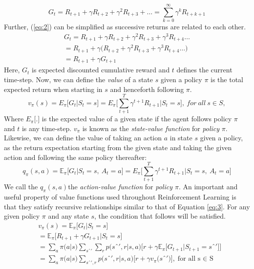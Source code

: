 \documentclass[12pt]{extarticle}
\numberwithin{equation}{section}
\begin{document}
	\begin{equation}
	G_t = R_{t+1}+\gamma R_{t+2}+\gamma^2 R_{t+3}+ \ldots =  \sum_{k=0}^{\infty} { \gamma ^{k} R_{t+k+1}} \label{eq:2}
	\end{equation}
	Further, (\ref{eq:2}) can be simplified as successive returns are related to each other.
	\begin{align}
	G_t = R_{t+1}+\gamma R_{t+2}+\gamma^2 R_{t+3}+\gamma^3 R_{t+4} \ldots \nonumber\\
	= R_{t+1}+\gamma\big(R_{t+2}+\gamma^2 R_{t+3}+\gamma^3 R_{t+4} \ldots\big) \nonumber\\
	= R_{t+1}+\gamma G_{t+1}  \label{eq:3}
	\end{align}
	Here, $G_t$ is expected discounted cumulative reward and $t$ defines the current time-step.
	Now, we can define the \textit{value} of a state $s$ given a policy $\pi$ is the total expected return when starting in $s$ and henceforth following $\pi$.
	\begin{equation}
	v_\pi(s) = E_\pi\big[G_t | S_t = s\big] = E_\pi{\bigg[ \sum_{t+1}^{T} { \gamma ^{t+1} R_{t+1} \bigg|S_t = s } \bigg],\ for\ all\ s\in S,} \label{eq:4}
	\end{equation}
	Where $E_\pi\big[.\big]$ is the expected value of a given state if the agent follows policy $\pi$ and $t$ is any time-step. $v_\pi$ is known as the \textit{state-value function} for \textit{policy} $\pi$. Likewise, we can define the value of taking an action $a$ in state $s$ given a policy, as the return expectation starting from the given state and taking the given action and following the same policy thereafter\cite{Sutton-introRL}:
	\begin{equation}
	q_\pi(s,a) = \mathbb{E}_\pi\big[G_t | S_t = s,\ A_t = a\big] = E_\pi{\bigg[ \sum_{t+1}^{T} { \gamma ^{t+1} R_{t+1} \bigg|S_t = s, \ A_t = a } \bigg]} \label{eq:5}
	\end{equation}
	We call the $q_\pi(s,a)$the  \textit{action-value function} for \textit{policy $\pi$}.
	An important and useful property of value functions used throughout Reinforcement Learning is that they satisfy recursive relationships similar to that of Equation \ref{eq:3}. For any given policy $\pi$ and any state $s$, the condition that follows will be satisfied.
	\begin{align}
	&v_\pi(s) = \mathbb{E}_\pi\big[G_t | S_t = s\big] \nonumber\\
	&= \mathbb{E}_\pi\big[R_{t+1} + \gamma G_{t+1} | S_t = s\big] \nonumber\\
	&=  \sum_{a} { \pi\big(a|s\big)}\sum_{sˆ'}\sum_{r}{p\big(sˆ',r|s,a\big)}\bigg[r+\gamma \mathbb{E}_{\pi}\big[G_{t+1}|S_{t+1} = sˆ'\big]\bigg] \nonumber\\
	&=  \sum_{a} { \pi\big(a|s\big)}\sum_{sˆ',r}{p\big(sˆ',r|s,a\big)}\bigg[r+\gamma v_{\pi}\big(sˆ'\big)\bigg],\text{for all s $\in$ S}  \label{eq:6}
	\end{align}
\end{document}
